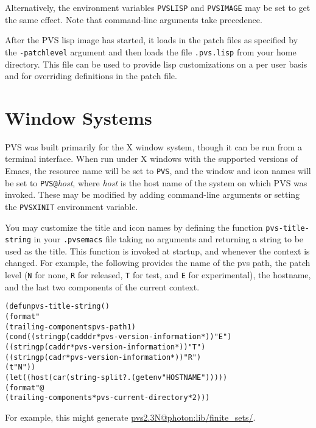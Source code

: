 Alternatively, the environment variables \texttt{PVSLISP} and
\texttt{PVSIMAGE} may be set to get the same effect.  Note that
command-line arguments take precedence.

After the PVS lisp image has started, it loads in the patch files as
specified by the {\tt -patchlevel} argument and then loads the file
{\tt .pvs.lisp} from your home directory.  This file can be used to
provide lisp customizations on a per user basis and for overriding
definitions in the patch file.



\section{Window Systems}
\label{windows}

PVS was built primarily for the X window system, though
it can be run from a terminal interface.
When run under X windows with the 
supported versions of Emacs, the resource name will be set to \texttt{PVS}, and the
window and icon names will be set to \texttt{PVS@}\textit{host\/},
where \textit{host\/} is the host name of the system on which PVS was
invoked.  These may be modified by adding command-line arguments or
setting the \texttt{PVSXINIT}%
 environment
variable.

You may customize the title and icon names by defining the function
\texttt{pvs-title-string} in your \texttt{.pvsemacs} file taking no
arguments and returning a string to be used as the title.  This function
is invoked at startup, and whenever the context is changed.  For example,
the following provides the name of the pvs path, the patch level
(\texttt{N} for none, \texttt{R} for released, \texttt{T} for test, and
\texttt{E} for experimental), the hostname, and the last two components of
the current context.

{\smaller
\begin{alltt}
    (defun pvs-title-string ()
      (format "%s%s%s:%s/"
          (trailing-components pvs-path 1)
        (cond ((stringp (cadddr *pvs-version-information*)) "E")
              ((stringp (caddr *pvs-version-information*)) "T")
              ((stringp (cadr *pvs-version-information*)) "R")
              (t "N"))
        (let ((host (car (string-split ?. (getenv "HOSTNAME")))))
          (format "@%s" host))
        (trailing-components *pvs-current-directory* 2)))
\end{alltt}}
\noindent For example, this might generate \url{pvs2.3N@photon:lib/finite_sets/}.

